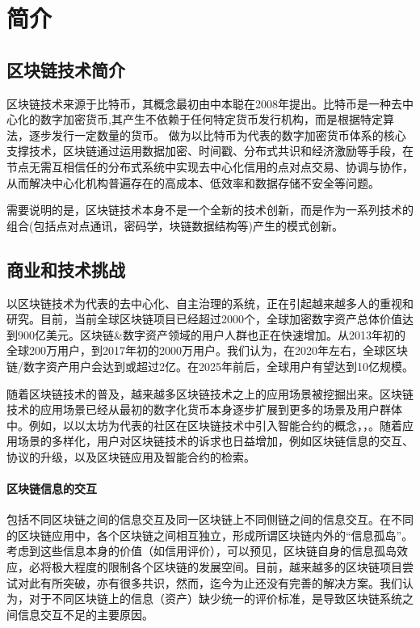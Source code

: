 \section{简介}

\subsection{区块链技术简介}
区块链技术来源于比特币\cite{Nakamoto2008}，其概念最初由中本聪在2008年提出。比特币是一种去中心化的数字加密货币,其产生不依赖于任何特定货币发行机构，而是根据特定算法，逐步发行一定数量的货币。
做为以比特币为代表的数字加密货币体系的核心支撑技术，区块链通过运用数据加密、时间戳、分布式共识和经济激励等手段，在节点无需互相信任的分布式系统中实现去中心化信用的点对点交易、协调与协作，从而解决中心化机构普遍存在的高成本、低效率和数据存储不安全等问题。

需要说明的是，区块链技术本身不是一个全新的技术创新，而是作为一系列技术的组合(包括点对点通讯，密码学，块链数据结构等)产生的模式创新。

\subsection{商业和技术挑战}
以区块链技术为代表的去中心化、自主治理的系统，正在引起越来越多人的重视和研究。目前，当前全球区块链项目已经超过2000个，全球加密数字资产总体价值达到900亿美元。区块链\&数字资产领域的用户人群也正在快速增加。从2013年初的全球200万用户，到2017年初的2000万用户。我们认为，在2020年左右，全球区块链/数字资产用户会达到或超过2亿。在2025年前后，全球用户有望达到10亿规模。

随着区块链技术的普及，越来越多区块链技术之上的应用场景被挖掘出来。区块链技术的应用场景已经从最初的数字化货币本身逐步扩展到更多的场景及用户群体中。例如，以以太坊为代表的社区在区块链技术中引入智能合约的概念，，。随着应用场景的多样化，用户对区块链技术的诉求也日益增加，例如区块链信息的交互、协议的升级，以及区块链应用及智能合约的检索。

\paragraph{区块链信息的交互}
包括不同区块链之间的信息交互及同一区块链上不同侧链之间的信息交互。在不同的区块链应用中，各个区块链之间相互独立，形成所谓区块链内外的“信息孤岛”。考虑到这些信息本身的价值（如信用评价），可以预见，区块链自身的信息孤岛效应，必将极大程度的限制各个区块链的发展空间。目前，越来越多的区块链项目尝试对此有所突破，亦有很多共识，然而，迄今为止还没有完善的解决方案。我们认为，对于不同区块链上的信息（资产）缺少统一的评价标准，是导致区块链系统之间信息交互不足的主要原因。

